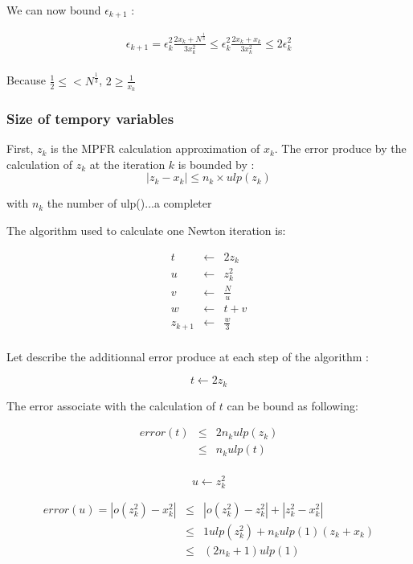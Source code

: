 \documentclass[12pt]{amsart}
\begin{document}
We can now bound $\epsilon_{k+1}$ :

\begin{eqnarray}\nonumber
\epsilon_{k+1} =  \epsilon^2_{k}
\frac{2x_k+N^{\frac{1}{3}}}{3x^2_k} \leq
\epsilon^2_{k}\frac{2x_k+x_k}{3x^2_k}\leq 2 \epsilon^2_{k}\\\nonumber
\end{eqnarray}

Because $\frac{1}{2}\leq<N^{\frac{1}{3}}$, $2\geq\frac{1}{x_k}$



\subsubsection{Size of tempory variables}


First, $z_k$ is the MPFR calculation approximation of $x_k$. The error
produce by the calculation of $z_k$ at the iteration $k$ is bounded by
:
\[
|z_k-x_k| \leq n_k \times ulp(z_k)
\]

with $n_k$ the number of ulp()...a completer

The algorithm used to calculate one Newton iteration is:

\begin{eqnarray}\nonumber
t&\leftarrow&2z_k\\\nonumber
u&\leftarrow&z_k^2\\\nonumber
v&\leftarrow&\frac{N}{u}\\\nonumber
w&\leftarrow&t+v\\\nonumber
z_{k+1}&\leftarrow&\frac{w}{3}\\\nonumber
\end{eqnarray}

Let describe the additionnal error produce at each step of the
algorithm :

\[
t \leftarrow 2 z_k
\]

The error associate with the calculation of $t$ can be bound as
following:

\begin{eqnarray}\nonumber
  error(t) &\leq& 2 n_k ulp(z_k)\\\nonumber
         &\leq& n_k ulp(t)\\\nonumber
\end{eqnarray}


\[
u\leftarrow z_k^2
\]



\begin{eqnarray}\nonumber
  error(u) = |o(z_k^2)-x_k^2| &\leq& |o(z_k^2)-z_k^2| +
  |z_k^2-x_k^2|\\\nonumber
         &\leq& 1 ulp(z_k^2) + n_k ulp(1) (z_k+x_k)\\\nonumber
         &\leq& (2 n_k + 1) ulp(1)\\\nonumber
\end{eqnarray}
\end{document}
